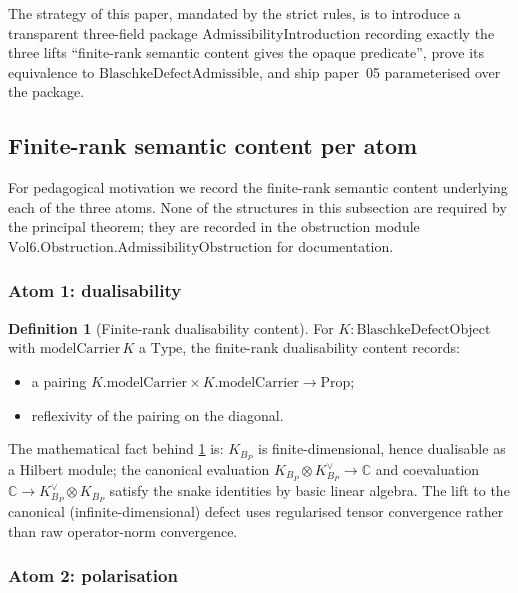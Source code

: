 \documentclass[12pt]{article}
\theoremstyle{definition}
\newtheorem{definition}[theorem]{Definition}
\theoremstyle{remark}
\newcommand{\KBP}{K_{B_{P}}}
\newcommand{\C}{\mathbb{C}}
\begin{document}
The strategy of this paper, mandated by the strict rules, is to introduce a transparent three-field package $\mathrm{AdmissibilityIntroduction}$ recording exactly the three lifts ``finite-rank semantic content gives the opaque predicate'', prove its equivalence to $\mathrm{BlaschkeDefectAdmissible}$, and ship paper~05 parameterised over the package.

\subsection{Finite-rank semantic content per atom}\label{subsec:finiteRankAtoms}

For pedagogical motivation we record the finite-rank semantic content underlying each of the three atoms. None of the structures in this subsection are required by the principal theorem; they are recorded in the obstruction module $\mathrm{Vol6.Obstruction.AdmissibilityObstruction}$ for documentation.

\subsubsection{Atom 1: dualisability}

\begin{definition}[Finite-rank dualisability content]\label{def:finiteRankDual}
For $K : \mathrm{BlaschkeDefectObject}$ with $\mathrm{modelCarrier}\,K$ a $\mathrm{Type}$, the finite-rank dualisability content records:
\begin{itemize}
  \item a pairing $K.\mathrm{modelCarrier} \times K.\mathrm{modelCarrier} \to \mathrm{Prop}$;
  \item reflexivity of the pairing on the diagonal.
\end{itemize}
\end{definition}

The mathematical fact behind \cref{def:finiteRankDual} is: $\KBP$ is finite-dimensional, hence dualisable as a Hilbert module; the canonical evaluation $\KBP \otimes \KBP^{\vee} \to \C$ and coevaluation $\C \to \KBP^{\vee} \otimes \KBP$ satisfy the snake identities by basic linear algebra. The lift to the canonical (infinite-dimensional) defect uses regularised tensor convergence rather than raw operator-norm convergence.

\subsubsection{Atom 2: polarisation}
\end{document}
